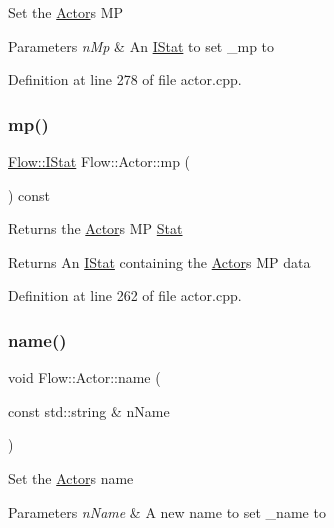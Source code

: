 Set the \hyperlink{class_flow_1_1_actor}{Actor}\textquotesingle{}s MP 
\begin{DoxyParams}{Parameters}
{\em n\+Mp} & An \hyperlink{class_flow_1_1_i_stat}{I\+Stat} to set \+\_\+mp to \\
\hline
\end{DoxyParams}


Definition at line 278 of file actor.\+cpp.

\hypertarget{class_flow_1_1_actor_a197cf5bc7b1b24c4e557adbdc6d9bbdf}{}\label{class_flow_1_1_actor_a197cf5bc7b1b24c4e557adbdc6d9bbdf} 
\subsubsection{\texorpdfstring{mp()}{mp()}\hspace{0.1cm}{\footnotesize\ttfamily [3/3]}}
{\footnotesize\ttfamily \hyperlink{class_flow_1_1_i_stat}{Flow\+::\+I\+Stat} Flow\+::\+Actor\+::mp (\begin{DoxyParamCaption}{ }\end{DoxyParamCaption}) const}

Returns the \hyperlink{class_flow_1_1_actor}{Actor}\textquotesingle{}s MP \hyperlink{class_flow_1_1_stat}{Stat} \begin{DoxyReturn}{Returns}
An \hyperlink{class_flow_1_1_i_stat}{I\+Stat} containing the \hyperlink{class_flow_1_1_actor}{Actor}\textquotesingle{}s MP data 
\end{DoxyReturn}


Definition at line 262 of file actor.\+cpp.

\hypertarget{class_flow_1_1_actor_ad30420df40d6fec219c9bbac83762b8a}{}\label{class_flow_1_1_actor_ad30420df40d6fec219c9bbac83762b8a} 
\subsubsection{\texorpdfstring{name()}{name()}\hspace{0.1cm}{\footnotesize\ttfamily [1/2]}}
{\footnotesize\ttfamily void Flow\+::\+Actor\+::name (\begin{DoxyParamCaption}\item[{const std\+::string \&}]{n\+Name }\end{DoxyParamCaption})}

Set the \hyperlink{class_flow_1_1_actor}{Actor}\textquotesingle{}s name 
\begin{DoxyParams}{Parameters}
{\em n\+Name} & A new name to set \+\_\+name to \\
\hline
\end{DoxyParams}


